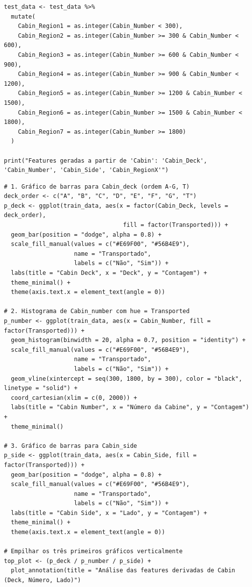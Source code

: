 \documentclass[12pt,a4paper]{article}
\begin{document}
\begin{verbatim}
test_data <- test_data %>%
  mutate(
    Cabin_Region1 = as.integer(Cabin_Number < 300),
    Cabin_Region2 = as.integer(Cabin_Number >= 300 & Cabin_Number < 600),
    Cabin_Region3 = as.integer(Cabin_Number >= 600 & Cabin_Number < 900),
    Cabin_Region4 = as.integer(Cabin_Number >= 900 & Cabin_Number < 1200),
    Cabin_Region5 = as.integer(Cabin_Number >= 1200 & Cabin_Number < 1500),
    Cabin_Region6 = as.integer(Cabin_Number >= 1500 & Cabin_Number < 1800),
    Cabin_Region7 = as.integer(Cabin_Number >= 1800)
  )

print("Features geradas a partir de 'Cabin': 'Cabin_Deck', 'Cabin_Number', 'Cabin_Side', 'Cabin_RegionX'")
\end{verbatim}

\begin{verbatim}
# 1. Gráfico de barras para Cabin_deck (ordem A-G, T)
deck_order <- c("A", "B", "C", "D", "E", "F", "G", "T")
p_deck <- ggplot(train_data, aes(x = factor(Cabin_Deck, levels = deck_order), 
                                  fill = factor(Transported))) +
  geom_bar(position = "dodge", alpha = 0.8) +
  scale_fill_manual(values = c("#E69F00", "#56B4E9"), 
                    name = "Transportado",
                    labels = c("Não", "Sim")) +
  labs(title = "Cabin Deck", x = "Deck", y = "Contagem") +
  theme_minimal() +
  theme(axis.text.x = element_text(angle = 0))

# 2. Histograma de Cabin_number com hue = Transported
p_number <- ggplot(train_data, aes(x = Cabin_Number, fill = factor(Transported))) +
  geom_histogram(binwidth = 20, alpha = 0.7, position = "identity") +
  scale_fill_manual(values = c("#E69F00", "#56B4E9"), 
                    name = "Transportado",
                    labels = c("Não", "Sim")) +
  geom_vline(xintercept = seq(300, 1800, by = 300), color = "black", linetype = "solid") +
  coord_cartesian(xlim = c(0, 2000)) +
  labs(title = "Cabin Number", x = "Número da Cabine", y = "Contagem") +
  theme_minimal()

# 3. Gráfico de barras para Cabin_side
p_side <- ggplot(train_data, aes(x = Cabin_Side, fill = factor(Transported))) +
  geom_bar(position = "dodge", alpha = 0.8) +
  scale_fill_manual(values = c("#E69F00", "#56B4E9"), 
                    name = "Transportado",
                    labels = c("Não", "Sim")) +
  labs(title = "Cabin Side", x = "Lado", y = "Contagem") +
  theme_minimal() +
  theme(axis.text.x = element_text(angle = 0))

# Empilhar os três primeiros gráficos verticalmente
top_plot <- (p_deck / p_number / p_side) +
  plot_annotation(title = "Análise das features derivadas de Cabin (Deck, Número, Lado)")


\end{verbatim}
\end{document}
